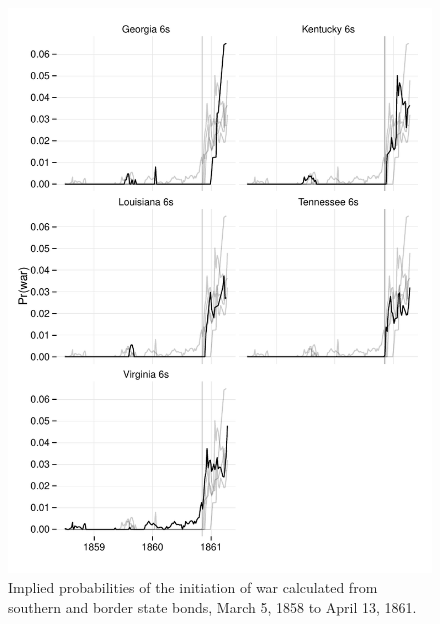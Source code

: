 \documentclass[11pt, oneside, article]{memoir}\usepackage[]{graphicx}\usepackage[]{color}
\begin{document}
\begin{figure}
  \centerfloat
  \includegraphics{figures/fig_prwar1-1}
  \caption{Implied probabilities of the initiation of war calculated from southern and border state bonds, March  5, 1858 to April 13, 1861.}
  \label{fig:prwar1}
\end{figure}
\end{document}
